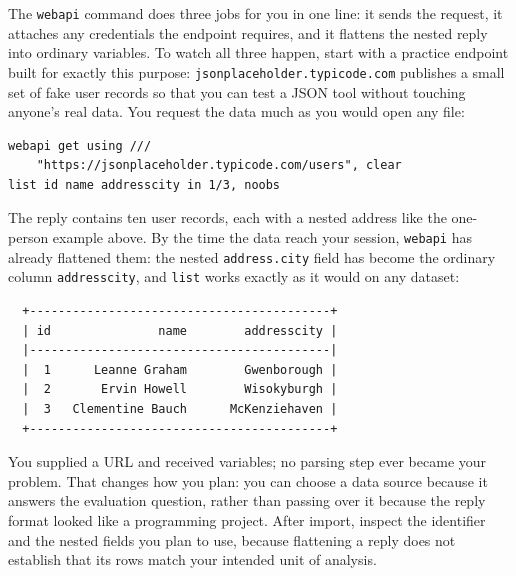 The \texttt{webapi} command does three jobs for you in one line: it sends the request, it attaches any credentials the endpoint requires, and it flattens the nested reply into ordinary variables. To watch all three happen, start with a practice endpoint built for exactly this purpose: \texttt{jsonplaceholder.typicode.com} publishes a small set of fake user records so that you can test a JSON tool without touching anyone's real data. You request the data much as you would open any file:
\par
{\footnotesize
\begin{verbatim}
webapi get using ///
    "https://jsonplaceholder.typicode.com/users", clear
list id name addresscity in 1/3, noobs
\end{verbatim}
}
The reply contains ten user records, each with a nested address like the one-person example above. By the time the data reach your session, \texttt{webapi} has already flattened them: the nested \texttt{address.city} field has become the ordinary column \texttt{addresscity}, and \texttt{list} works exactly as it would on any dataset:
\par
{\footnotesize
\begin{verbatim}
  +------------------------------------------+
  | id               name        addresscity |
  |------------------------------------------|
  |  1      Leanne Graham        Gwenborough |
  |  2       Ervin Howell        Wisokyburgh |
  |  3   Clementine Bauch      McKenziehaven |
  +------------------------------------------+
\end{verbatim}
}
You supplied a URL and received variables; no parsing step ever became your problem. That changes how you plan: you can choose a data source because it answers the evaluation question, rather than passing over it because the reply format looked like a programming project. After import, inspect the identifier and the nested fields you plan to use, because flattening a reply does not establish that its rows match your intended unit of analysis.


